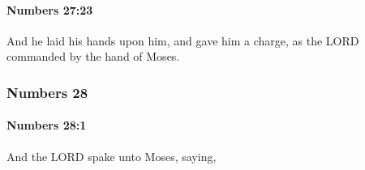 		\paragraph{Numbers 27:23} %
			\label{NUMBERS-27-23}

			And he laid his hands upon him, and gave him a charge, as the LORD commanded by the hand of Moses.

	\subsubsection{Numbers 28} %
		\label{NUMBERS-28}

		\paragraph{Numbers 28:1} %
			\label{NUMBERS-28-1}

			And the LORD spake unto Moses, saying,

